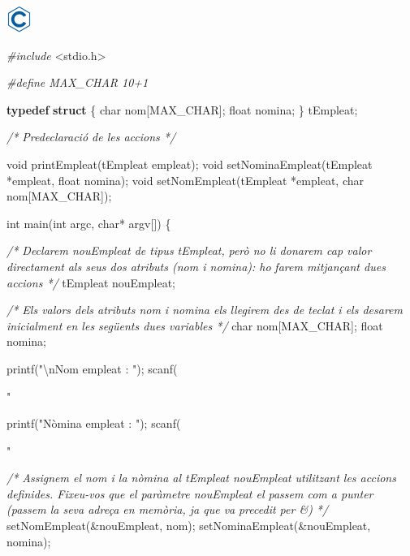 \documentclass[]{book}
\newenvironment{Shaded}{\begin{snugshade}}{\end{snugshade}}
\newcommand{\KeywordTok}[1]{\textcolor[rgb]{0.13,0.29,0.53}{\textbf{#1}}}
\newcommand{\DataTypeTok}[1]{\textcolor[rgb]{0.13,0.29,0.53}{#1}}
\newcommand{\SpecialCharTok}[1]{\textcolor[rgb]{0.00,0.00,0.00}{#1}}
\newcommand{\StringTok}[1]{\textcolor[rgb]{0.31,0.60,0.02}{#1}}
\newcommand{\ImportTok}[1]{#1}
\newcommand{\CommentTok}[1]{\textcolor[rgb]{0.56,0.35,0.01}{\textit{#1}}}
\newcommand{\PreprocessorTok}[1]{\textcolor[rgb]{0.56,0.35,0.01}{\textit{#1}}}
\newcommand{\NormalTok}[1]{#1}
\begin{document}
\includegraphics{./img/c.png}

\begin{Shaded}
\begin{Highlighting}[]
\PreprocessorTok{#include }\ImportTok{<stdio.h>}

\PreprocessorTok{#define MAX_CHAR 10+1}

\KeywordTok{typedef} \KeywordTok{struct}\NormalTok{ \{}
    \DataTypeTok{char}\NormalTok{ nom[MAX_CHAR];}
    \DataTypeTok{float}\NormalTok{ nomina;}
\NormalTok{\} tEmpleat;}

\CommentTok{/* Predeclaració de les accions */}

\DataTypeTok{void}\NormalTok{ printEmpleat(tEmpleat empleat);}
\DataTypeTok{void}\NormalTok{ setNominaEmpleat(tEmpleat *empleat, }\DataTypeTok{float}\NormalTok{ nomina);}
\DataTypeTok{void}\NormalTok{ setNomEmpleat(tEmpleat *empleat, }\DataTypeTok{char}\NormalTok{ nom[MAX_CHAR]);}

\DataTypeTok{int}\NormalTok{ main(}\DataTypeTok{int}\NormalTok{ argc, }\DataTypeTok{char}\NormalTok{* argv[]) \{}

    \CommentTok{/* Declarem nouEmpleat de tipus tEmpleat,}
\CommentTok{       però no li donarem cap valor directament}
\CommentTok{       als seus dos atributs (nom i nomina): ho }
\CommentTok{       farem mitjançant dues accions */}
\NormalTok{    tEmpleat nouEmpleat;}
   
    \CommentTok{/* Els valors dels atributs nom i nomina els}
\CommentTok{       llegirem des de teclat i els desarem inicialment}
\CommentTok{       en les següents dues variables */}
    \DataTypeTok{char}\NormalTok{ nom[MAX_CHAR];}
    \DataTypeTok{float}\NormalTok{ nomina;}
   
\NormalTok{    printf(}\StringTok{"}\SpecialCharTok{\textbackslash{}n}\StringTok{Nom empleat : "}\NormalTok{);}
\NormalTok{    scanf(}\StringTok{"%
      
\NormalTok{    printf(}\StringTok{"Nòmina empleat : "}\NormalTok{);}
\NormalTok{    scanf(}\StringTok{"%
   
    \CommentTok{/* Assignem el nom i la nòmina al tEmpleat nouEmpleat}
\CommentTok{       utilitzant les accions definides. Fixeu-vos}
\CommentTok{       que el paràmetre nouEmpleat el passem com a punter}
\CommentTok{       (passem la seva adreça en memòria, ja que va }
\CommentTok{       precedit per &) */}
\NormalTok{    setNomEmpleat(&nouEmpleat, nom);}
\NormalTok{    setNominaEmpleat(&nouEmpleat, nomina);}
   
}}
\end{Highlighting}
\end{Shaded}
\end{document}
